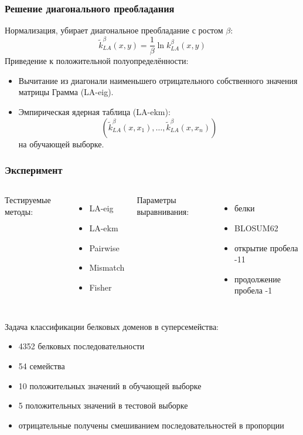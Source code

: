 \documentclass{beamer}
\begin{document}
\begin{frame}
\frametitle{Решение диагонального преобладания}
Нормализация, убирает диагональное преобладание с ростом $\beta$:
\begin{equation*}
    \widetilde{k}_{LA}^{\beta}(x, y)
    = \frac{1}{\beta} \ln k_{LA}^{\beta}(x, y)
\end{equation*}
Приведение к положительной полуопределённости:
\begin{itemize}
    \item Вычитание из диагонали
        наименьшего отрицательного собственного значения
        матрицы Грамма (LA-eig).
        \bigskip

    \item Эмпирическая ядерная таблица (LA-ekm):
    \begin{equation*}
        (\widetilde{k}_{LA}^{\beta}(x, x_1), \dots,
        \widetilde{k}_{LA}^{\beta}(x, x_n))
    \end{equation*}
    на обучающей выборке.

\end{itemize}
\end{frame}

\begin{frame}
\frametitle{Эксперимент}
\begin{columns}
    Тестируемые методы:
    \begin{itemize}
        \item LA-eig
        \item LA-ekm
        \item Pairwise
        \item Mismatch
        \item Fisher
    \end{itemize}

    Параметры выравнивания:
    \begin{itemize}
        \item белки
        \item BLOSUM62
        \item открытие пробела -11
        \item продолжение пробела -1
    \end{itemize}
\end{columns}
\bigskip

Задача классификации белковых доменов в суперсемейства:
\begin{itemize}
    \item 4352 белковых последовательности
    \item 54 семейства
    \item 10 положительных значений в обучающей выборке
    \item 5 положительных значений в тестовой выборке
    \item отрицательные получены
        смешиванием последовательностей в пропорции
\end{itemize}
\end{frame}
\end{document}
